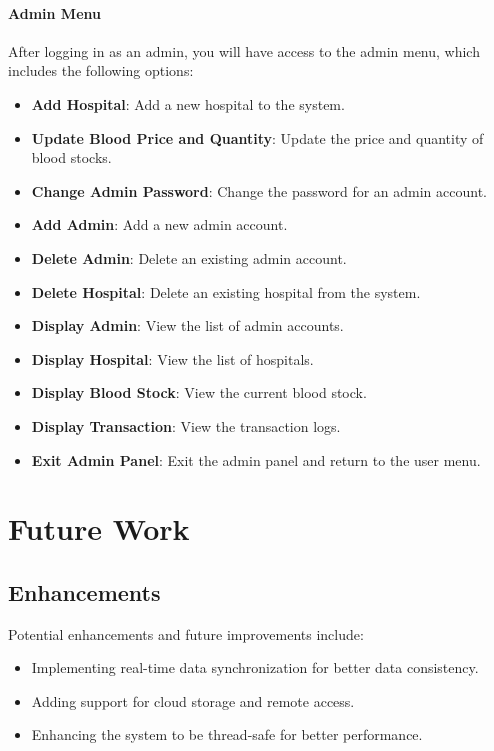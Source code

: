 \documentclass[12pt,a4paper]{report}
\begin{document}
\subsubsection{Admin Menu}
After logging in as an admin, you will have access to the admin menu, which includes the following options:
\begin{itemize}
    \item \normalsize \textbf{Add Hospital}: Add a new hospital to the system.
    \item \normalsize \textbf{Update Blood Price and Quantity}: Update the price and quantity of blood stocks.
    \item \normalsize \textbf{Change Admin Password}: Change the password for an admin account.
    \item \normalsize \textbf{Add Admin}: Add a new admin account.
    \item \normalsize \textbf{Delete Admin}: Delete an existing admin account.
    \item \normalsize \textbf{Delete Hospital}: Delete an existing hospital from the system.
    \item \normalsize \textbf{Display Admin}: View the list of admin accounts.
    \item \normalsize \textbf{Display Hospital}: View the list of hospitals.
    \item \normalsize \textbf{Display Blood Stock}: View the current blood stock.
    \item \normalsize \textbf{Display Transaction}: View the transaction logs.
    \item \normalsize \textbf{Exit Admin Panel}: Exit the admin panel and return to the user menu.
\end{itemize}

\chapter{Future Work}

\section{Enhancements}
Potential enhancements and future improvements include:
\begin{itemize}
    \item Implementing real-time data synchronization for better data consistency.
    \item Adding support for cloud storage and remote access.
    \item Enhancing the system to be thread-safe for better performance.
\end{itemize}
\end{document}
